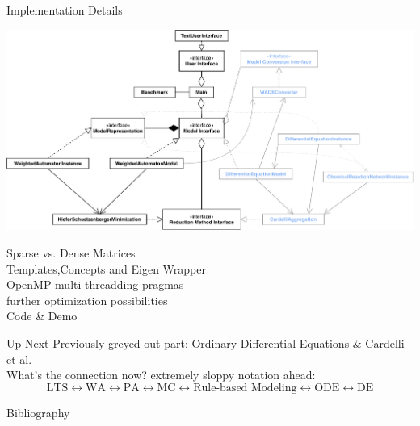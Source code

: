 \documentclass[rgb, pdf]{beamer}
\begin{document}
    \begin{frame}[allowframebreaks]{Implementation Details}
        \begin{center}
                \includegraphics[keepaspectratio, height=0.8\textheight, width=\textwidth]{img/class_compact_wa.pdf}
        \end{center}
        \framebreak
        
        Sparse vs. Dense Matrices \\ \vspace{0.5cm}
        Templates,Concepts and Eigen Wrapper \\ \vspace{0.5cm}
        OpenMP multi-threadding pragmas \\ \vspace{0.5cm}
        further optimization possibilities \\ \vspace{0.5cm}
        Code \& Demo \\ \vspace{0.5cm}
    \end{frame}
    
    
    \begin{frame}{Up Next}
        Previously greyed out part: Ordinary Differential Equations \& Cardelli et al.~\autocite{Cardelli2017MaximalAO} \\ \vspace{0.5cm}
        What's the connection now? \alert{extremely sloppy notation ahead:} \\
        \[ \text{LTS} \leftrightarrow \text{WA} \leftrightarrow \text{PA} \leftrightarrow \text{MC} \leftrightarrow \text{Rule-based Modeling} \leftrightarrow \text{ODE} \leftrightarrow \text{DE} \]
    \end{frame}
  
    
    \begin{frame}{Bibliography}
        \printbibliography
    \end{frame}
\end{document}
